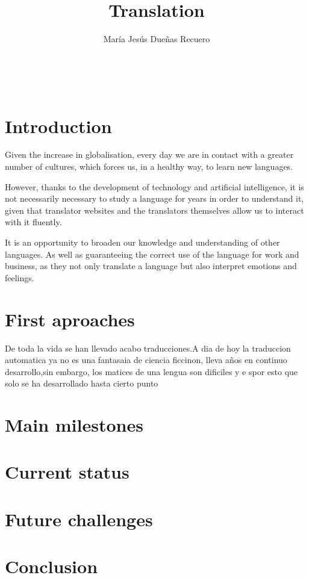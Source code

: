 \documentclass[a4paper]{article}
\title{Translation}
\author{María Jesús Dueñas Recuero}
\date{

 \\ \texttt{MJesus.duenas1@alu.uclm.es}\\[2ex]%
}
\theoremstyle{plain}
\theoremstyle{definition}
\begin{document}
	\maketitle
	\newpage
	\
	\tableofcontents
	\newpage
	\section{Introduction}
	\label{sec:intro}
	\begin{flushleft}
	Given the increase in globalisation, every day we are in contact with a greater number of cultures, which forces us, in a healthy way, to learn new languages.

	However, thanks to the development of technology and artificial intelligence, it is not necessarily necessary to study a language for years in order to understand it, given that translator websites and the translators themselves allow us to interact with it fluently.

	It is an opportunity to broaden our knowledge and understanding of other languages. As well as guaranteeing the correct use of the language for work and business, as they not only translate a language but also interpret emotions and feelings.
	
    \end{flushleft}
	
	


	
	
	\section{First aproaches}
	\label{sec:examples}
	\begin{flushleft}
	De toda la vida se han llevado acabo traducciones.A dia de hoy la traduccion automatica ya no es una fantasaia de ciencia ficcinon, lleva años en continuo desarrollo,sin embargo, los matices de una lengua son dificiles y e spor esto que solo se ha desarrollado hasta cierto punto
	\end{flushleft}
	
	
	
	
	
    \section{Main milestones}
	\label{sec:examples}
	\section{Current status}
	\label{sec:examples}
	\section{Future challenges}
	\label{sec:examples}
	
	\section{Conclusion}
	\label{sec:examples}	
	
	
	
	
	
	
	\appendix
	
	
	
	\lipsum[7]
	
\end{document}
